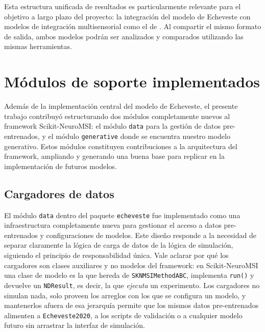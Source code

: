 Esta estructura unificada de resultados es particularmente relevante para el objetivo a largo plazo del proyecto: la integración del modelo de Echeveste con modelos de integración multisensorial como el de \citet{cuppini2017biologically}. Al compartir el mismo formato de salida, ambos modelos podrán ser analizados y comparados utilizando las mismas herramientas.


\section{Módulos de soporte implementados}
\label{sec:impl_modulos_soporte}

Además de la implementación central del modelo de Echeveste, el presente trabajo contribuyó estructurando dos módulos completamente nuevos al framework Scikit-NeuroMSI: el módulo \texttt{data} para la gestión de datos pre-entrenados, y el módulo \texttt{generative} donde se encuentra nuestro modelo generativo. Estos módulos constituyen contribuciones a la arquitectura del framework, ampliando y generando una buena base para replicar en la implementación de futuros modelos.

\subsection{Cargadores de datos}
\label{subsec:impl_modulo_data}

El módulo \texttt{data} dentro del paquete \texttt{echeveste} fue implementado como una infraestructura completamente nueva para gestionar el acceso a datos pre-entrenados y configuraciones de modelos. Este diseño responde a la necesidad de separar claramente la lógica de carga de datos de la lógica de simulación, siguiendo el principio de responsabilidad única. Vale aclarar por qué los cargadores son clases auxiliares y no modelos del framework: en Scikit-NeuroMSI una clase de modelo es la que hereda de \texttt{SKNMSIMethodABC}, implementa \texttt{run()} y devuelve un \texttt{NDResult}, es decir, la que \textit{ejecuta} un experimento. Los cargadores no simulan nada, solo proveen los arreglos con los que se configura un modelo, y mantenerlos afuera de esa jerarquía permite que los mismos datos pre-entrenados alimenten a \texttt{Echeveste2020}, a los scripts de validación o a cualquier modelo futuro sin arrastrar la interfaz de simulación.

